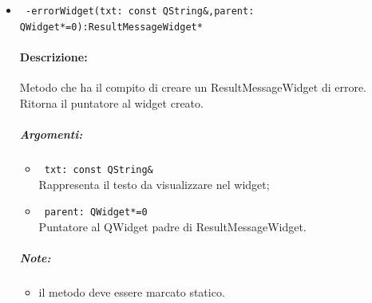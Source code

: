 \begin{itemize}
\item \color{blue}\verb! -errorWidget(txt: const QString&,parent: QWidget*=0):ResultMessageWidget*!
\color{black}
\paragraph{Descrizione: }Metodo che ha il compito di creare un ResultMessageWidget di errore. Ritorna il puntatore al widget creato.
\subparagraph{Argomenti:}
\begin{itemize}
\item \color{RoyalPurple} \verb! txt: const QString& ! \\ Rappresenta il testo da visualizzare nel widget;
\item  \color{RoyalPurple} \verb! parent: QWidget*=0 ! \\ Puntatore al QWidget padre di ResultMessageWidget.
\end{itemize}
\subparagraph{Note:}
\begin{itemize}
\item il metodo deve essere marcato statico.
\end{itemize}

\end{itemize}


